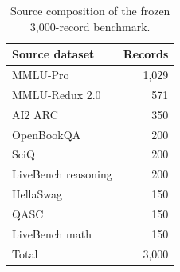 \begin{table}[htbp]
\centering
\small
\caption{Source composition of the frozen 3,000-record benchmark.}
\label{tab:dataset-composition}
\begin{tabular}{lr}
\toprule
Source dataset & Records \\
\midrule
MMLU-Pro & 1,029 \\
MMLU-Redux 2.0 & 571 \\
AI2 ARC & 350 \\
OpenBookQA & 200 \\
SciQ & 200 \\
LiveBench reasoning & 200 \\
HellaSwag & 150 \\
QASC & 150 \\
LiveBench math & 150 \\
\midrule
Total & 3,000 \\
\bottomrule
\end{tabular}

\end{table}
